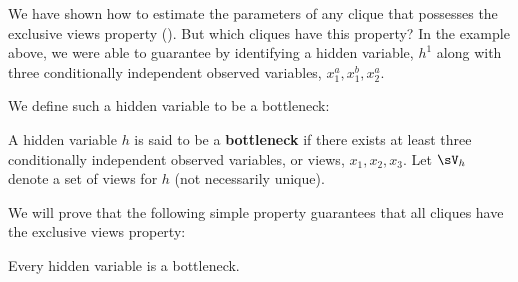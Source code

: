 We have shown how to estimate the parameters of any clique that possesses the exclusive
  views property ().  But which cliques have this property?
In the example above, we were able to guarantee 
  by identifying a hidden variable, $h^1$ along with three conditionally
  independent observed variables, $x^a_1, x^b_1, x^a_2$.

We define such a hidden variable to be a bottleneck:
\begin{definition}[Bottleneck]
  A hidden variable $h$ is said to be a \textbf{bottleneck} if there exists at
    least three conditionally independent observed variables, or views,
    $x_1, x_2, x_3$. 
  Let $\sV_{h}$ denote a set of views for $h$ (not necessarily unique).
\end{definition}

We will prove that the following simple property guarantees that all cliques
have the exclusive views property:
\begin{property}
  \label{prop:bottleneck}
  Every hidden variable is a bottleneck.
\end{property}



